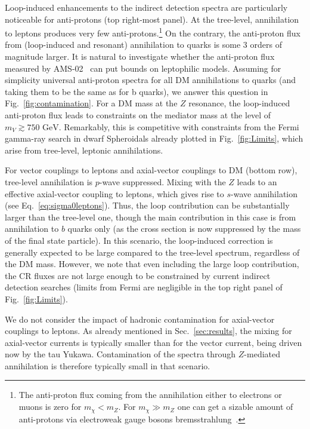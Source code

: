 \documentclass[final,5p,twocolumn]{elsarticle}
\begin{document}
Loop-induced enhancements to the indirect detection spectra are particularly noticeable for anti-protons (top right-most panel). At the tree-level, annihilation to leptons produces very few anti-protons.\footnote{The anti-proton flux coming from the annihilation either to electrons or muons is zero for $m_\chi < m_{Z}$. For $m_\chi \gg m_{Z}$ one can get a sizable amount of anti-protons via electroweak gauge bosons bremsstrahlung~\cite{Kachelriess:2007aj,Bell:2008ey,Kachelriess:2009zy,Ciafaloni:2010qr,Ciafaloni:2010ti}.} On the contrary, the anti-proton flux from (loop-induced and resonant) annihilation to quarks is some 3 orders of magnitude larger. It is natural to investigate whether the anti-proton flux measured by AMS-02~\cite{Aguilar:2016kjl,Cuoco:2016eej} can put bounds on leptophilic models. Assuming for simplicity universal anti-proton spectra for all DM annihilations to quarks (and taking them to be the same as for b quarks), we answer this question in Fig.~\ref{fig:contamination}. For a DM mass at the $Z$ resonance, the loop-induced anti-proton flux leads to constraints on the mediator mass at the level of $m_V \gtrsim 750\,\,\mathrm{GeV}$. Remarkably, this is competitive with constraints from the Fermi gamma-ray search in dwarf Spheroidals already plotted in Fig.~\ref{fig:Limits}, which arise from tree-level, leptonic annihilations. 

For vector couplings to leptons and axial-vector couplings to DM (bottom row), tree-level annihilation is $p$-wave suppressed. Mixing with the $Z$ leads to an effective axial-vector coupling to leptons, which gives rise to $s$-wave annihilation (see Eq.~\ref{eq:sigma0leptons}). Thus, the loop contribution can be substantially larger than the tree-level one, though the main contribution in this case is from annihilation to $b$ quarks only (as the cross section is now suppressed by the mass of the final state particle). In this scenario, the loop-induced correction is generally expected to be large compared to the tree-level spectrum, regardless of the DM mass. However, we note that even including the large loop contribution, the CR fluxes are not large enough to be constrained by current indirect detection searches (limits from Fermi are negligible in the top right panel of Fig.~\ref{fig:Limits}). 

We do not consider the impact of hadronic contamination for axial-vector couplings to leptons. As already mentioned in Sec.~\ref{sec:results}, the mixing for axial-vector currents is typically smaller than for the vector current, being driven now by the tau Yukawa. Contamination of the spectra through $Z$-mediated annihilation is therefore typically small in that scenario.
\end{document}
